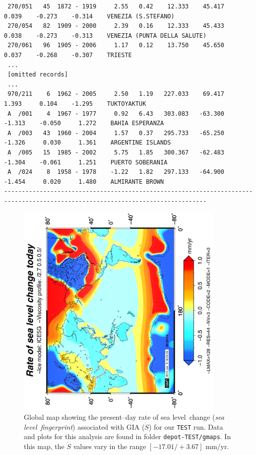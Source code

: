 \documentclass[11pt,fleqn,a4paper,titlepage]{article}
\newcommand\sealevel{sea level~}
\begin{document}
\begin{table}[h]
{{\begin{verbatim}
 270/051   45  1872 - 1919     2.55   0.42    12.333    45.417     0.039    -0.273    -0.314    VENEZIA (S.STEFANO)           
 270/054   82  1909 - 2000     2.39   0.16    12.333    45.433     0.038    -0.273    -0.313    VENEZIA (PUNTA DELLA SALUTE)  
 270/061   96  1905 - 2006     1.17   0.12    13.750    45.650     0.037    -0.268    -0.307    TRIESTE                       
 ...
 [omitted records]
 ...
 970/211    6  1962 - 2005     2.50   1.19   227.033    69.417     1.393     0.104    -1.295    TUKTOYAKTUK                   
 A  /001    4  1967 - 1977     0.92   6.43   303.083   -63.300    -1.313    -0.050     1.272    BAHIA ESPERANZA               
 A  /003   43  1960 - 2004     1.57   0.37   295.733   -65.250    -1.326     0.030     1.361    ARGENTINE ISLANDS             
 A  /005   15  1985 - 2002     5.75   1.85   300.367   -62.483    -1.304    -0.061     1.251    PUERTO SOBERANIA              
 A  /024    8  1958 - 1978    -1.22   1.82   297.133   -64.900    -1.454     0.020     1.480    ALMIRANTE BROWN               
------------------------------------------------------------------------------------------------------------------------------- 
\end{verbatim} }}
\label{tab:test-run-tg}
\end{table}  
\newpage

\begin{figure}[h]
\begin{center}
\includegraphics[width=0.9\textwidth, angle=-90]{./Figures/sdotmap.png}
\caption[Relative \sealevel fingerprint]{\small{Global map showing the present--day rate of \sealevel change (\textit{\sealevel fingerprint}) associated with GIA ($\dot S$)
for our \texttt{TEST} run. Data and plots for this analysis are found in folder \texttt{depot-TEST/gmaps}. In this map, the $\dot S$ values vary in the range $[-17.01/+3.67]$ mm/yr.}}
\label{fig:sdot}
\end{center}
\end{figure}
\newpage
\end{document}
